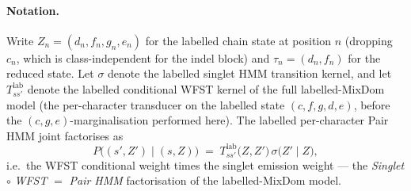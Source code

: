 \paragraph{Notation.} Write $Z_n = (d_n, f_n, g_n, e_n)$ for the
labelled chain state at position $n$ (dropping $c_n$, which is
class-independent for the indel block) and $\tau_n = (d_n, f_n)$
for the reduced state. Let $\sigma$ denote the labelled singlet
HMM transition kernel, and let $T^{\text{lab}}_{ss'}$
denote the labelled conditional WFST kernel of the full labelled-MixDom
model (the per-character transducer on the labelled state
$(c, f, g, d, e)$, before the $(c, g, e)$-marginalisation performed
here). The labelled per-character Pair HMM
joint factorises as
\begin{equation}
\label{eq:pair-fact}
P\big((s', Z') \mid (s, Z)\big)
\;=\; T^{\text{lab}}_{ss'}\!\big(Z, Z'\big)\,
      \sigma\!\big(Z' \mid Z\big),
\end{equation}
i.e.\ the WFST conditional weight times the singlet emission
weight --- the \textit{Singlet} $\circ$ \textit{WFST} $=$ \textit{Pair HMM}
factorisation of the labelled-MixDom model.

